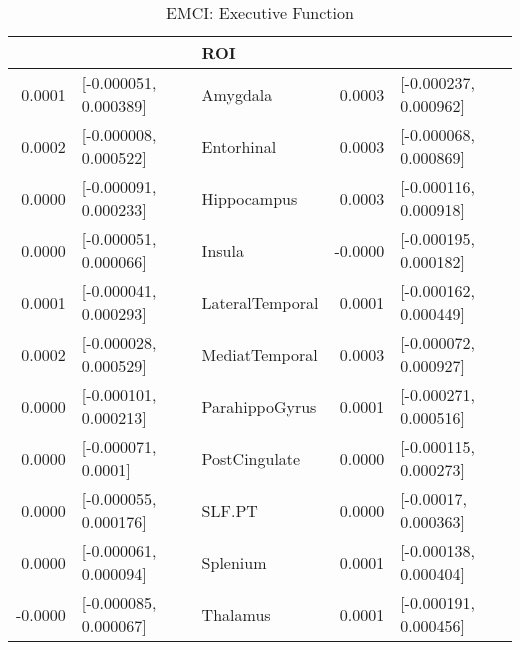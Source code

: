 \documentclass{article}
\begin{document}
\begin{table}[H]
\centering
\caption{EMCI: Executive Function} 
\begin{tabular}{rllrl}
  \toprule
\cellcolor{red!30}{B2} & \cellcolor{red!30}{CI} & ROI & \cellcolor{blue!30}{B3} & \cellcolor{blue!30}{CI} \\ 
  \midrule
0.0001 & [-0.000051, 0.000389] & Amygdala & 0.0003 & [-0.000237, 0.000962] \\ 
  0.0002 & [-0.000008, 0.000522] & Entorhinal & 0.0003 & [-0.000068, 0.000869] \\ 
  0.0000 & [-0.000091, 0.000233] & Hippocampus & 0.0003 & [-0.000116, 0.000918] \\ 
  0.0000 & [-0.000051, 0.000066] & Insula & -0.0000 & [-0.000195, 0.000182] \\ 
  0.0001 & [-0.000041, 0.000293] & LateralTemporal & 0.0001 & [-0.000162, 0.000449] \\ 
  0.0002 & [-0.000028, 0.000529] & MediatTemporal & 0.0003 & [-0.000072, 0.000927] \\ 
  0.0000 & [-0.000101, 0.000213] & ParahippoGyrus & 0.0001 & [-0.000271, 0.000516] \\ 
  0.0000 & [-0.000071, 0.0001] & PostCingulate & 0.0000 & [-0.000115, 0.000273] \\ 
  0.0000 & [-0.000055, 0.000176] & SLF.PT & 0.0000 & [-0.00017, 0.000363] \\ 
  0.0000 & [-0.000061, 0.000094] & Splenium & 0.0001 & [-0.000138, 0.000404] \\ 
  -0.0000 & [-0.000085, 0.000067] & Thalamus & 0.0001 & [-0.000191, 0.000456] \\ 
   \bottomrule
\end{tabular}
\end{table}
\end{document}
